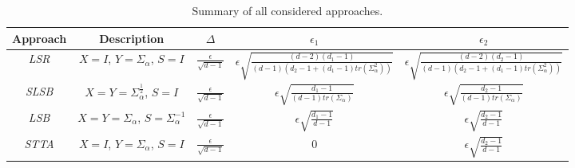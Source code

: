 \documentclass[sigconf]{acmart}
\newcommand{\hfirst}{{\it LSR}\xspace}
\newcommand{\hsecond}{{\it SLSB}\xspace}
\newcommand{\hthird}{{\it LSB}\xspace}
\newcommand{\otta}{{\it STTA}\xspace}
\begin{document}
\begin{table*}[htb]
	{\begin{tabular}{|c|c|c|c|c|}
			\hline
			Approach & Description & $\Delta$ & $\epsilon_1$ & $\epsilon_2$\\ \hline
			\hfirst & $X = I$, $Y = \Sigma_\alpha$, $S = I$ & $\frac{\epsilon}{\sqrt{d-1}}$ & $\epsilon \sqrt{\frac{(d-2)(d_1-1)}{(d-1) (d_2 -1 + (d_1-1) tr(\Sigma_\alpha^2))}}$ & $\epsilon \sqrt{\frac{(d-2)(d_2-1)}{(d-1) (d_2 -1 + (d_1-1) tr(\Sigma_\alpha^2))}}$\\ \hline
			\hsecond & $X=Y=\Sigma_\alpha^{\frac{1}{2}}$, $S=I$ & $\frac{\epsilon}{\sqrt{d-1}}$ &
			$\epsilon\sqrt{\frac{d_1-1}{(d-1)tr(\Sigma_\alpha)}}$ & $\epsilon\sqrt{\frac{d_2-1}{(d-1)tr(\Sigma_\alpha)}}$\\ \hline
			\hthird & $X=Y=\Sigma_\alpha$, $S=\Sigma_\alpha^{-1}$ & $\frac{\epsilon}{\sqrt{d-1}}$ &
			$\epsilon\sqrt{\frac{d_1-1}{d-1}}$ & $\epsilon\sqrt{\frac{d_2-1}{d-1}}$\\ \hline 
			\otta & $X=I$, $Y=\Sigma_\alpha$, $S=I$ & $\frac{\epsilon}{\sqrt{d-1}}$ &
			$0$ & $\epsilon\sqrt{\frac{d_2-1}{d-1}}$\\ \hline
	\end{tabular}}
	\caption{Summary of all considered approaches\label{tab:summary}.}
\end{table*}
\end{document}
